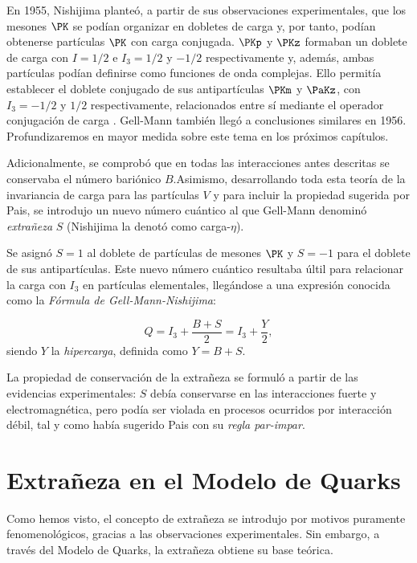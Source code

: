 En 1955, Nishijima planteó, a partir de sus observaciones experimentales, que los mesones $\PK$ se podían organizar en dobletes de carga y, por tanto, podían obtenerse partículas $\PK$ con carga conjugada. $\PKp$ y $\PKz$ formaban un doblete de carga con $I=1/2$ e $I_3=1/2$ y $-1/2$ respectivamente y, además, ambas partículas podían definirse como funciones de onda complejas. Ello permitía establecer el doblete conjugado de sus antipartículas $\PKm$ y $\PaKz$, con $I_3=-1/2$ y $1/2$ respectivamente, relacionados entre sí mediante el operador conjugación de carga \cite{Nishijima1955}. Gell-Mann también llegó a conclusiones similares en 1956. Profundizaremos en mayor medida sobre este tema en los próximos capítulos.

Adicionalmente, se comprobó que en todas las interacciones antes descritas se conservaba el número bariónico $B$.\protect\footnotemark Asimismo, desarrollando toda esta teoría de la invariancia de carga para las partículas $V$ y para incluir la propiedad sugerida por Pais, se introdujo un nuevo número cuántico al que Gell-Mann denominó \textit{extrañeza} $S$ (Nishijima la denotó como carga-$\eta$).


Se asignó $S=1$ al doblete de partículas de mesones $\PK$ y $S=-1$ para el doblete de sus antipartículas. Este nuevo número cuántico resultaba últil para relacionar la carga con $I_3$ en partículas elementales, llegándose a una expresión conocida como la \textit{Fórmula de Gell-Mann-Nishijima}:

\begin{equation}
Q=I_3+ \frac{B+S}{2}=I_3+\frac{Y}{2} ,
\end{equation}
siendo $Y$ la \textit{hipercarga}, definida como $Y=B+S$.

La propiedad de conservación de la extrañeza se formuló a partir de las evidencias experimentales: $S$ debía conservarse en las interacciones fuerte y electromagnética, pero podía ser violada en procesos ocurridos por interacción débil, tal y como había sugerido Pais con su \textit{regla par-impar}.\\


\section{Extrañeza en el Modelo de Quarks}\label{cap:strangeness_quark_model}
Como hemos visto, el concepto de extrañeza se introdujo por motivos puramente fenomenológicos, gracias a las observaciones experimentales. Sin embargo, a través del Modelo de Quarks, la extrañeza obtiene su base teórica.

